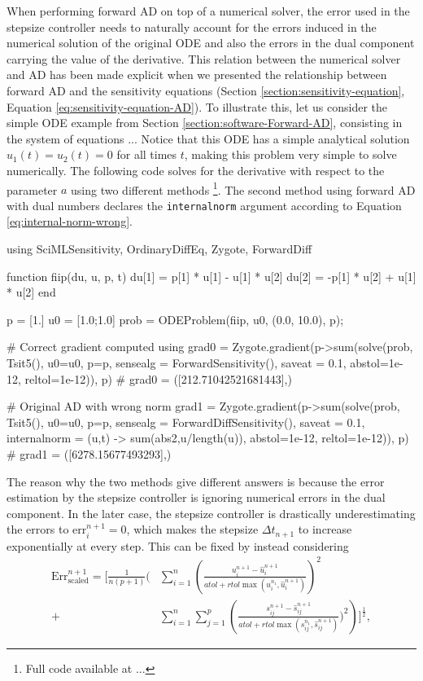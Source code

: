 When performing forward AD on top of a numerical solver, the error used in the stepsize controller needs to naturally account for the errors induced in the numerical solution of the original ODE and also the errors in the dual component carrying the value of the derivative. 
This relation between the numerical solver and AD has been made explicit when we presented the relationship between forward AD and the sensitivity equations (Section \ref{section:sensitivity-equation}, Equation \eqref{eq:sensitivity-equation-AD}). 
To illustrate this, let us consider the simple ODE example from Section \ref{section:software-Forward-AD}, consisting in the system of equations 
... 
Notice that this ODE has a simple analytical solution $u_1(t) = u_2(t) = 0$ for all times $t$, making this problem very simple to solve numerically.
The following code solves for the derivative with respect to the parameter $a$ using two different methods \footnote{Full code available at ...}. 
The second method using forward AD with dual numbers declares the \texttt{internalnorm} argument according to Equation \eqref{eq:internal-norm-wrong}.
\begin{jllisting}
using SciMLSensitivity, OrdinaryDiffEq, Zygote, ForwardDiff

function fiip(du, u, p, t)
    du[1] =  p[1] * u[1] - u[1] * u[2]
    du[2] = -p[1] * u[2] + u[1] * u[2]
end

p = [1.]
u0 = [1.0;1.0]
prob = ODEProblem(fiip, u0, (0.0, 10.0), p);

# Correct gradient computed using 
grad0 = Zygote.gradient(p->sum(solve(prob, Tsit5(), u0=u0, p=p, sensealg = ForwardSensitivity(), saveat = 0.1, abstol=1e-12, reltol=1e-12)), p)
# grad0 = ([212.71042521681443],)

# Original AD with wrong norm 
grad1 = Zygote.gradient(p->sum(solve(prob, Tsit5(), u0=u0, p=p, sensealg = ForwardDiffSensitivity(), saveat = 0.1, internalnorm = (u,t) -> sum(abs2,u/length(u)), abstol=1e-12, reltol=1e-12)), p)
# grad1 = ([6278.15677493293],)
\end{jllisting}
The reason why the two methods give different answers is because the error estimation by the stepsize controller is ignoring numerical errors in the dual component. 
In the later case, the stepsize controller is drastically underestimating the errors to $\text{err}_i^{n+1} = 0$, which makes the stepsize $\Delta t_{n+1}$ to increase exponentially at every step. 
This can be fixed by instead considering 
\begin{align}
    \text{Err}_\text{scaled}^{n+1}
    =
    \Bigg[ \frac{1}{n(p+1)} \Bigg( 
    &\sum_{i=1}^n \left( \frac{u_i^{n+1} - \hat u_i^{n+1}}{atol + rtol \max (u_i^{n_1}, \hat u_i^{n+1})} \right)^2 \nonumber \\
    + 
    &\sum_{i=1}^n \sum_{j=1}^p  
    \left( \frac{s_{ij}^{n+1} - \hat s_{ij}^{n+1}}{atol + rtol \max (s_{ij}^{n_1}, \hat s_{ij}^{n+1})} \Bigg)^2 \right)
    \Bigg]^{\frac{1}{2}},
    \label{eq:internal-norm-correct} 
\end{align}
